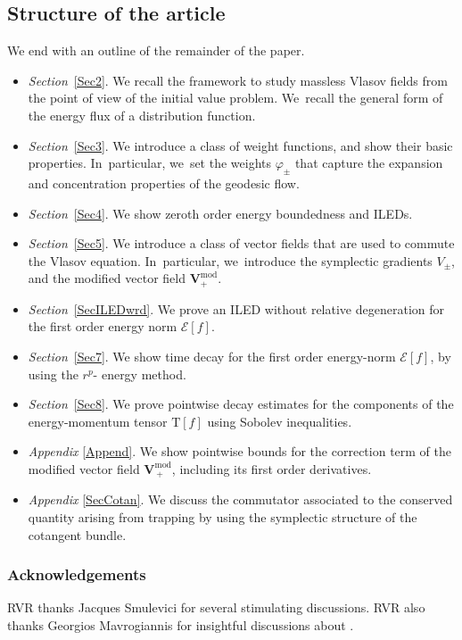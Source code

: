 \documentclass[10pt]{amsart}
\theoremstyle{plain}
\theoremstyle{definition}
\providecommand{\didot}{\rmfamily}
\begin{document}
\subsection{Structure of the article}
We end with an outline of the remainder of the paper.

\begin{itemize}
\item {\didot\emph{Section}}~\ref{Sec2}. We recall the framework to study massless Vlasov fields from the point of view of the initial value problem. We~recall the general form of the energy flux of a distribution function.
\item {\didot\emph{Section}}~\ref{Sec3}. We introduce a class of weight functions, and show their basic properties. In~particular, we~set the weights $\varphi_{\pm}$ that capture the expansion and concentration properties of the geodesic flow.
\item {\didot\emph{Section}}~\ref{Sec4}. We show zeroth order energy boundedness and ILEDs.
\item {\didot\emph{Section}}~\ref{Sec5}. We introduce a class of vector fields that are used to commute the Vlasov equation. In~particular, we~introduce the symplectic gradients $V_{\pm}$, and the modified vector field $\pmb{V}_+^{\mathrm{mod}}$.
\item {\didot\emph{Section}}~\ref{SecILEDwrd}. We prove an ILED without relative degeneration for the first order energy norm $\mathcal{E}[f]$.
\item {\didot\emph{Section}}~\ref{Sec7}. We show time decay for the first order energy-norm $\mathcal{E}[f]$, by using the $r^p$- energy method.
\item {\didot\emph{Section}}~\ref{Sec8}. We prove pointwise decay estimates for the components of the energy-momentum tensor $\mathrm{T}[f]$ using Sobolev inequalities.
\item {\didot\emph{Appendix}} \ref{Append}. We show pointwise bounds for the correction term of the modified vector field $\pmb{V}_{\, +}^{\mathrm{mod}}$, including its first order derivatives.
\item {\didot\emph{Appendix}} \ref{SecCotan}. We discuss the commutator associated to the conserved quantity arising from trapping by using the symplectic structure of the cotangent bundle.
\end{itemize}

\subsubsection*{Acknowledgements}
RVR thanks Jacques Smulevici for several stimulating discussions. RVR also thanks Georgios Mavrogiannis for insightful discussions about \cite{Mavr23, Mavq}.
\end{document}
